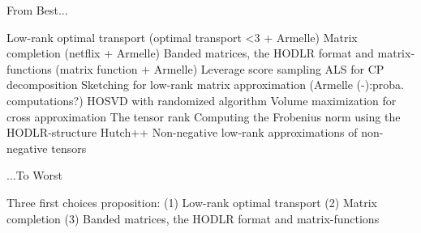 From Best...

Low-rank optimal transport (optimal transport <3 + Armelle)
Matrix completion (netflix + Armelle)
Banded matrices, the HODLR format and matrix-functions (matrix function + Armelle)
Leverage score sampling
ALS for CP decomposition
Sketching for low-rank matrix approximation (Armelle (-):proba. computations?)
HOSVD with randomized algorithm
Volume maximization for cross approximation
The tensor rank
Computing the Frobenius norm using the HODLR-structure
Hutch++
Non-negative low-rank approximations of non-negative tensors

...To Worst

Three first choices proposition:
(1) Low-rank optimal transport
(2) Matrix completion
(3) Banded matrices, the HODLR format and matrix-functions